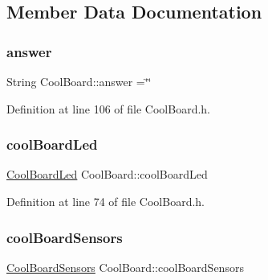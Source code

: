 \subsection{Member Data Documentation}
\mbox{\label{class_cool_board_a7b835fafd449e5282f7f91d787a2dc15}} 
\subsubsection{\texorpdfstring{answer}{answer}}
{\footnotesize\ttfamily String Cool\+Board\+::answer =\char`\"{}\char`\"{}\hspace{0.3cm}{\ttfamily [private]}}



Definition at line 106 of file Cool\+Board.\+h.

\mbox{\label{class_cool_board_a1b1d3c684a5baa56b08486e192fd8e97}} 
\subsubsection{\texorpdfstring{cool\+Board\+Led}{coolBoardLed}}
{\footnotesize\ttfamily \hyperlink{class_cool_board_led}{Cool\+Board\+Led} Cool\+Board\+::cool\+Board\+Led\hspace{0.3cm}{\ttfamily [private]}}



Definition at line 74 of file Cool\+Board.\+h.

\mbox{\label{class_cool_board_af102be5288bd7f7a8e59b13f86e26a00}} 
\subsubsection{\texorpdfstring{cool\+Board\+Sensors}{coolBoardSensors}}
{\footnotesize\ttfamily \hyperlink{class_cool_board_sensors}{Cool\+Board\+Sensors} Cool\+Board\+::cool\+Board\+Sensors\hspace{0.3cm}{\ttfamily [private]}}



